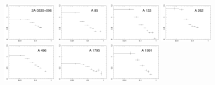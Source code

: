 \documentclass{aa}
\begin{document}
\begin{figure}[!]

                \includegraphics[width=0.236\textwidth,trim={0 0 0 0},clip]{fig_2A0335_Fe.pdf}
                \includegraphics[width=0.236\textwidth,trim={0 0 0 0},clip]{fig_A85_Fe.pdf}
                \includegraphics[width=0.236\textwidth,trim={0 0 0 0},clip]{fig_A133_Fe.pdf}
                \includegraphics[width=0.236\textwidth,trim={0 0 0 0},clip]{fig_A262_Fe.pdf} \\
                \includegraphics[width=0.236\textwidth,trim={0 0 0 0},clip]{fig_A496_Fe.pdf}
                \includegraphics[width=0.236\textwidth,trim={0 0 0 0},clip]{fig_A1795_Fe.pdf}
                \includegraphics[width=0.236\textwidth,trim={0 0 0 0},clip]{fig_A1991_Fe.pdf}

\end{figure}
\end{document}
